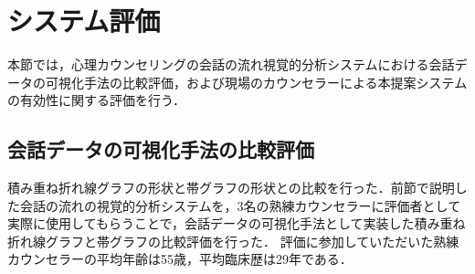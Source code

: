 \documentclass[shuuron]{kuee}
\begin{document}



%
%



\section{システム評価}%



本節では，心理カウンセリングの会話の流れ視覚的分析システムにおける会話データの可視化手法の比較評価，および現場のカウンセラーによる本提案システムの有効性に関する評価を行う．%
%
%
%
%
%
%








\subsection{会話データの可視化手法の比較評価}
積み重ね折れ線グラフの形状と帯グラフの形状との比較を行った．前節で説明した会話の流れの視覚的分析システムを，3名の熟練カウンセラーに評価者として実際に使用してもらうことで，会話データの可視化手法として実装した積み重ね折れ線グラフと帯グラフの比較評価を行った．
評価に参加していただいた熟練カウンセラーの平均年齢は55歳，平均臨床歴は29年である．
\end{document}
